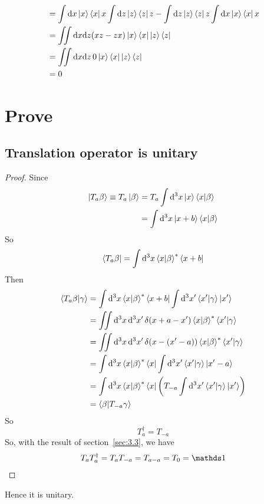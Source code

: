 \documentclass{article}
\begin{document}
\begin{align*}
    [X,Z] &= \int \dd x\ket{x}\bra{x} x \int \dd z\ket{z}\bra{z} z
        - \int \dd z\ket{z}\bra{z} z \int \dd x\ket{x}\bra{x} x \\
        &= \iint \dx\dz (xz - zx) \ket{x}\bra{x}\ket{z}\bra{z} \\
        &= \iint \dx\dz \, 0 \ket{x}\bra{x}\ket{z}\bra{z} \\
        &= 0
\end{align*}

\section{Prove}
\subsection{Translation operator is unitary}
\begin{proof}
Since
\begin{align*}
    \ket{T_a \beta} \equiv T_a \ket{\beta} &= T_a \int \dd[3]{x}
    \ket{x} \braket{x|\beta} \\
        &=  \int \dd[3]{x} \ket{x+b} \braket{x|\beta}
\end{align*}
So
\begin{align*}
    \bra{T_a \beta} = \int \dd[3]{x} \braket{x|\beta}^* \bra{x+b}
\end{align*}
Then 
\begin{align*}
    \braket{T_a \beta|\gamma } &= \int \dd[3]{x} \braket{x|\beta}^* \bra{x+b}
        \int \dd[3]{x'} \braket{x'|\gamma} \ket{x'}\\
        &= \iint\dd[3]{x}\dd[3]{x'}\delta(x+a-x')
        \braket{x|\beta}^*\braket{x'|\gamma} \\
        &= \iint\dd[3]{x}\dd[3]{x'}\delta(x-(x'-a))
        \braket{x|\beta}^*\braket{x'|\gamma} \\
        &= \int \dd[3]{x} \braket{x|\beta}^* \bra{x}
        \int \dd[3]{x'} \braket{x'|\gamma} \ket{x'-a}\\
        &= \int \dd[3]{x} \braket{x|\beta}^* \bra{x}
        \left(T_{-a} \int \dd[3]{x'} \braket{x'|\gamma} \ket{x'}\right)\\
        &= \braket{\beta | T_{-a} \gamma}
\end{align*}
So
\begin{equation}
    T_a^\dagger = T_{-a}
\end{equation}
So, with the result of section~\ref{sec:3.3}, we have
\begin{align*}
    T_a T_a^\dagger = T_a T_{-a} = T_{a-a} = T_0 = \id
\end{align*}
\end{proof}
Hence it is unitary.
\end{document}
